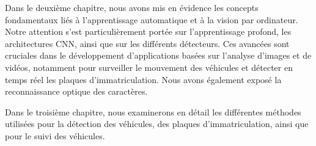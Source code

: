 Dans le deuxième chapitre, nous avons mis en évidence les concepts fondamentaux liés à l'apprentissage automatique et à la vision par ordinateur. Notre attention s'est particulièrement portée sur l'apprentissage profond, les architectures CNN, ainsi que sur les différents détecteurs. Ces avancées sont cruciales dans le développement d'applications basées sur l'analyse d'images et de vidéos, notamment pour surveiller le mouvement des véhicules et détecter en temps réel les plaques d'immatriculation. Nous avons également exposé la reconnaissance optique des caractères.

Dans le troisième chapitre, nous examinerons en détail les différentes méthodes utilisées pour la détection des véhicules, des plaques d'immatriculation, ainsi que pour le suivi des véhicules. 


